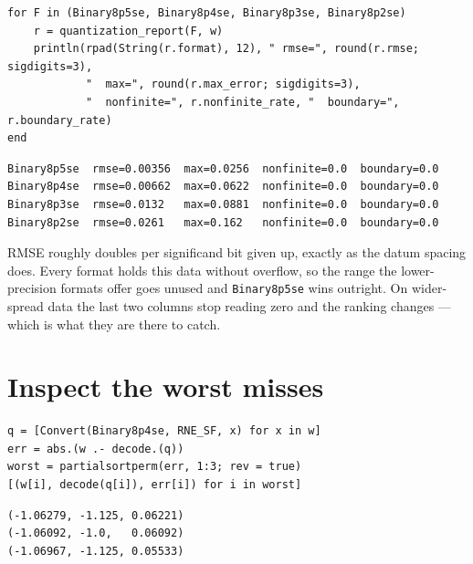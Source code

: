 \nopagebreak[4]
\begin{minipage}{\linewidth}
\begin{verbatim}
for F in (Binary8p5se, Binary8p4se, Binary8p3se, Binary8p2se)
    r = quantization_report(F, w)
    println(rpad(String(r.format), 12), " rmse=", round(r.rmse; sigdigits=3),
            "  max=", round(r.max_error; sigdigits=3),
            "  nonfinite=", r.nonfinite_rate, "  boundary=", r.boundary_rate)
end
\end{verbatim}




\begin{verbatim}
Binary8p5se  rmse=0.00356  max=0.0256  nonfinite=0.0  boundary=0.0
Binary8p4se  rmse=0.00662  max=0.0622  nonfinite=0.0  boundary=0.0
Binary8p3se  rmse=0.0132   max=0.0881  nonfinite=0.0  boundary=0.0
Binary8p2se  rmse=0.0261   max=0.162   nonfinite=0.0  boundary=0.0
\end{verbatim}
\end{minipage}




RMSE roughly doubles per significand bit given up, exactly as the datum spacing does. Every format holds this data without overflow, so the range the lower-precision formats offer goes unused and \texttt{Binary8p5se} wins outright. On wider-spread data the last two columns stop reading zero and the ranking changes — which is what they are there to catch.



\section{Inspect the worst misses}



\label{18179706212253785775}{}



\begin{minipage}{\linewidth}
\begin{verbatim}
q = [Convert(Binary8p4se, RNE_SF, x) for x in w]
err = abs.(w .- decode.(q))
worst = partialsortperm(err, 1:3; rev = true)
[(w[i], decode(q[i]), err[i]) for i in worst]
\end{verbatim}




\begin{verbatim}
(-1.06279, -1.125, 0.06221)
(-1.06092, -1.0,   0.06092)
(-1.06967, -1.125, 0.05533)
\end{verbatim}
\end{minipage}




